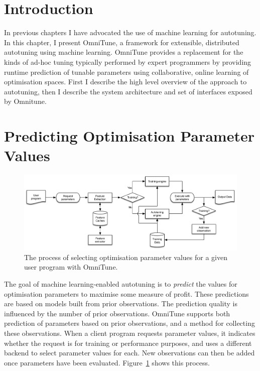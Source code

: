 \section{Introduction}

In previous chapters I have advocated the use of machine learning for
autotuning. In this chapter, I present OmniTune, a framework for
extensible, distributed autotuning using machine learning. OmniTune
provides a replacement for the kinds of ad-hoc tuning typically
performed by expert programmers by providing runtime prediction of
tunable parameters using collaborative, online learning of
optimisation spaces. First I describe the high level overview of the
approach to autotuning, then I describe the system architecture and
set of interfaces exposed by Omnitune.


\section{Predicting Optimisation Parameter Values}

\begin{figure}[b]
\centering
\includegraphics[width=\textwidth]{img/omnitune-system-flow.pdf}
\caption[Optimisation parameter selection with OmniTune]{%
  The process of selecting optimisation parameter values for a given
  user program with OmniTune.%
}
\label{fig:omnitune-system-flow}
\end{figure}

The goal of machine learning-enabled autotuning is to \emph{predict}
the values for optimisation parameters to maximise some measure of
profit. These predictions are based on models built from prior
observations. The prediction quality is influenced by the number of
prior observations. OmniTune supports both prediction of parameters
based on prior observations, and a method for collecting these
observations. When a client program requests parameter values, it
indicates whether the request is for training or performance purposes,
and uses a different backend to select parameter values for each. New
observations can then be added once parameters have been evaluated.
Figure~\ref{fig:omnitune-system-flow} shows this process.


